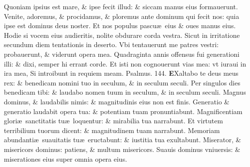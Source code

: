 \documentclass[a5paper,10pt]{book}
\def\ae{æ}
\begin{document}
\begin{multicols*}{2}
\newline \color{red} Q\color{black}uoniam ipsius est mare, \& ipse fecit illud: \& siccam manus eius formauerunt.
\newline \color{red} V\color{black}enite, adoremus, \& procidamus, \& ploremus ante dominum qui fecit nos: quia ipse est dominus deus noster.
\newline \color{red} E\color{black}t nos populus pascu\ae \ eius \& oues manus eius.
\newline \color{red} H\color{black}odie si vocem eius audieritis, nolite obdurare corda vestra.
\newline \color{red} S\color{black}icut in irritatione secundum diem tentationis in deserto.
\newline \color{red} V\color{black}bi tentauerunt me patres vestri: probauerunt, \& viderunt opera mea. %
\newline \color{red} Q\color{black}uadraginta annis offensus fui generationi illi: \& dixi, semper hi errant corde.
\newline \color{red} E\color{black}t isti non cognouerunt vias mea: vt iuraui in ira mea, Si introibunt in requiem meam.%
\quad \color{red} Psalmus. \hypertarget{ps144}{144.}\color{black}
\lettrine[lines=2]{\bfseries \color{red} E}{}Xaltabo te deus meus rex: \& benedicam nomini tuo in seculum, \& in seculum seculi.
\newline \color{red} P\color{black}er singulos dies benedicam tibi: \& laudabo nomen tuum in seculum, \& in seculum seculi.
\newline \color{red} M\color{black}agnus dominus, \& laudabilis nimis: \& magnitudinis eius non est finis.
\newline \color{red} G\color{black}eneratio \& generatio laudabit opera tua: \& potentiam tuam pronuntiabunt.
\newline \color{red} M\color{black}agnificentiam glori\ae \ sanctitatis tu\ae \ loquentur: \& mirabilia tua narrabunt.
\newline \color{red} E\color{black}t virtutem terribilium tuorum dicent: \& magnitudinem tuam narrabunt.
\newline \color{red} M\color{black}emoriam abundanti\ae \ suauitatis tu\ae \ eructabunt: \& iustitia tua exultabunt.
\newline \color{red} M\color{black}iserator, \& misericors dominus: patiens, \& multum misericors.
\newline \color{red} S\color{black}uauis dominus vniuersis: \& miserationes eius super omnia opera eius.

\end{multicols*}
\end{document}
